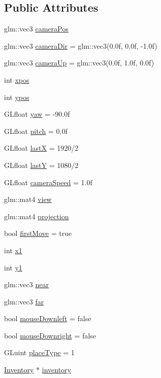 \subsection*{Public Attributes}
\begin{DoxyCompactItemize}
\item 
glm\+::vec3 \hyperlink{class_camera_a424bcf971a87506ba6770f2c5c1073f0}{camera\+Pos}
\item 
glm\+::vec3 \hyperlink{class_camera_ad641b25d477900ac4f3cd859ac14e8f7}{camera\+Dir} = glm\+::vec3(0.\+0f, 0.\+0f, -\/1.\+0f)
\item 
glm\+::vec3 \hyperlink{class_camera_a517042b127746997f9472d51bbae2610}{camera\+Up} = glm\+::vec3(0.\+0f, 1.\+0f, 0.\+0f)
\item 
int \hyperlink{class_camera_afd43dba2d208aeb4e04dee6eb171e731}{xpos}
\item 
int \hyperlink{class_camera_a29db8762c5a7b2b9a7ffd2a31b9ffb8e}{ypos}
\item 
G\+Lfloat \hyperlink{class_camera_a2062d85e03c0fa14d5e13f3dc74c5d95}{yaw} = -\/90.\+0f
\item 
G\+Lfloat \hyperlink{class_camera_a005a78960a2726c637951b75a00925c8}{pitch} = 0.\+0f
\item 
G\+Lfloat \hyperlink{class_camera_ab551353ae0163e4483f36470d42226f2}{last\+X} = 1920/2
\item 
G\+Lfloat \hyperlink{class_camera_a3aeb91bbf0256cac3b523353795ed398}{last\+Y} = 1080/2
\item 
G\+Lfloat \hyperlink{class_camera_a8f67cd3183810d8d675d38cc62af966a}{camera\+Speed} = 1.\+0f
\item 
glm\+::mat4 \hyperlink{class_camera_add93fedd6b9a6a6e2c784aeda624de83}{view}
\item 
glm\+::mat4 \hyperlink{class_camera_a43555a0ae83f9ec696ee257e5fd48cf2}{projection}
\item 
bool \hyperlink{class_camera_aa4eb398210af281d598297d6a86c6c21}{first\+Move} = true
\item 
int \hyperlink{class_camera_a7abcf313641b6ed5be07c4c0ea04f266}{x1}
\item 
int \hyperlink{class_camera_a54e3acc8db5fb8faf8757f93bedd7a32}{y1}
\item 
glm\+::vec3 \hyperlink{class_camera_a10619630853c71114ba755595067955c}{near}
\item 
glm\+::vec3 \hyperlink{class_camera_a4188ea5916dac6f8a4edae1d0a625326}{far}
\item 
bool \hyperlink{class_camera_aba5bea2c77f7e3157307d9e272ada8ab}{mouse\+Downleft} = false
\item 
bool \hyperlink{class_camera_a3a2c6b49cdf87ea655f8d6dd97194855}{mouse\+Downright} = false
\item 
G\+Luint \hyperlink{class_camera_abcb0dd3d79e1066f6922f539b801586f}{place\+Type} = 1
\item 
\hyperlink{class_inventory}{Inventory} $\ast$ \hyperlink{class_camera_ae10beb7db168af6a6f35d4be223cccf3}{inventory}
\end{DoxyCompactItemize}


